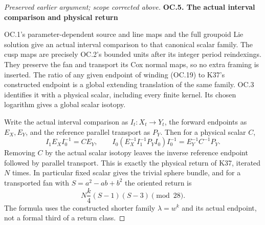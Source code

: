 \begin{proof}[Preserved earlier argument; scope corrected above]
\par

\medskip\noindent\textbf{OC.5. The actual interval comparison and physical return}

\par\nobreak

OC.1's parameter-dependent source and line maps and the full
groupoid Lie solution give an actual interval comparison to that
canonical scalar family. The cusp maps are precisely OC.2's bounded
units after its integer period reindexings. They preserve the fan
and transport its Cox normal maps, so no extra framing is inserted.
The ratio of any given endpoint of winding (OC.19) to K37's
constructed endpoint is a global extending translation of the same
family. OC.3 identifies it with a physical scalar, including every
finite kernel. Its chosen logarithm gives a global scalar isotopy.

Write the actual interval comparison as \(I_t:X_t\to Y_t\),
the forward endpoints as \(E_X,E_Y\), and the reference parallel
transport as \(P_Y\). Then for a physical scalar \(C\),
\[
 I_1E_XI_0^{-1}=C E_Y,\qquad
 I_0(E_X^{-1}I_1^{-1}P_YI_0)I_0^{-1}
                  =E_Y^{-1}C^{-1}P_Y.                   \tag{OC.21}
\]
Removing \(C\) by the actual scalar isotopy leaves the inverse
reference endpoint followed by parallel transport. This is exactly
the physical return of K37, iterated \(N\) times. In particular
fixed scalar gives the trivial sphere bundle, and for a transported
fan with \(S=a^2-ab+b^2\) the oriented return is
\[
                    N\frac{k}{4}(S-1)(S-3)\pmod{28}.     \tag{OC.22}
\]
The formula uses the constructed shorter family \(\lambda=w^k\)
and its actual endpoint, not a formal third of a return class.

\end{proof}

